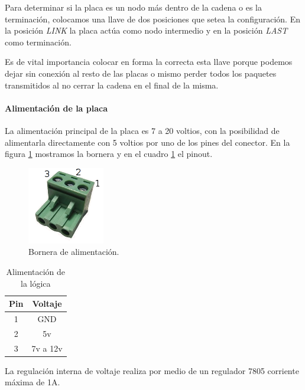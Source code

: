 Para determinar si la placa es un nodo m\'as dentro de la cadena o es la terminaci\'on, colocamos una llave de dos posiciones
que setea la configuraci\'on.
En la posici\'on \emph{LINK} la placa act\'ua como nodo intermedio y en la posici\'on \emph{LAST} como terminaci\'on.

Es de vital importancia colocar en forma la correcta esta llave porque podemos dejar sin conexi\'on al resto de las placas o mismo
perder todos los paquetes transmitidos al no cerrar la cadena en el final de la misma.

\paragraph{Alimentaci\'on de la placa}
\label{h_placas_generica_alimentacion}

La alimentaci\'on principal de la placa es 7 a 20 voltios, con la posibilidad de alimentarla directamente con 5 voltios
por uno de los pines del conector.
En la figura \ref{hF_placa_gen_borneras} mostramos la bornera y en el cuadro \ref{hT_placa_gen_alimentacion} el pinout.

\begin{figure}[ht]
	\centering
	\includegraphics[scale=.3]{figuras/bornera3.png}
	\caption{Bornera de alimentaci\'on.}
	\label{hF_placa_gen_borneras}
\end{figure}

\begin{table}
	\begin{center}
		\begin{tabular}{|c|c|}
			\hline
			Pin & Voltaje \\
			\hline
			1 & GND \\
			\hline
			2 & 5v \\
			\hline
			3 & 7v a 12v \\
			\hline
		\end{tabular}
		\caption{Alimentaci\'on de la l\'ogica}
		\label{hT_placa_gen_alimentacion}
	\end{center}
\end{table}

La regulaci\'on interna de voltaje realiza por medio de un regulador 7805 corriente m\'axima de 1A.


